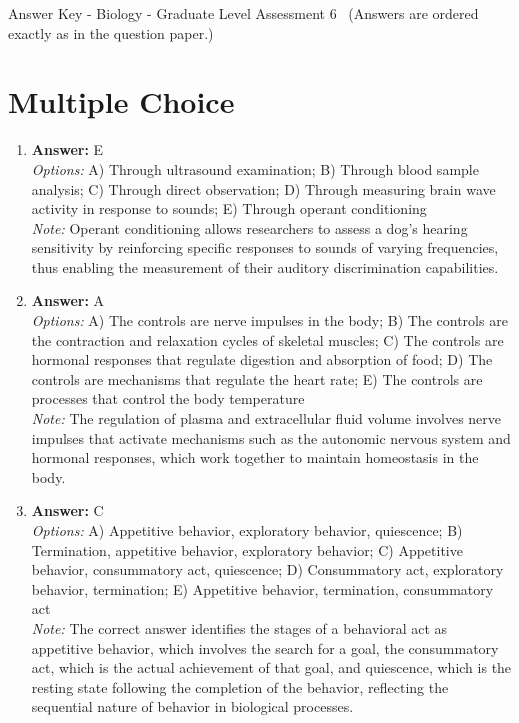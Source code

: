 \documentclass[12pt]{article}
\begin{document}
\begin{center}
Answer Key - Biology - Graduate Level Assessment 6 \
\small (Answers are ordered exactly as in the question paper.)
\end{center}

\section*{Multiple Choice}
\begin{enumerate}[label=\arabic*.]
\item \textbf{Answer:} E
\\ \textit{Options:} A) Through ultrasound examination; B) Through blood sample analysis; C) Through direct observation; D) Through measuring brain wave activity in response to sounds; E) Through operant conditioning
\\ \textit{Note:} Operant conditioning allows researchers to assess a dog's hearing sensitivity by reinforcing specific responses to sounds of varying frequencies, thus enabling the measurement of their auditory discrimination capabilities.
\item \textbf{Answer:} A
\\ \textit{Options:} A) The controls are nerve impulses in the body; B) The controls are the contraction and relaxation cycles of skeletal muscles; C) The controls are hormonal responses that regulate digestion and absorption of food; D) The controls are mechanisms that regulate the heart rate; E) The controls are processes that control the body temperature
\\ \textit{Note:} The regulation of plasma and extracellular fluid volume involves nerve impulses that activate mechanisms such as the autonomic nervous system and hormonal responses, which work together to maintain homeostasis in the body.
\item \textbf{Answer:} C
\\ \textit{Options:} A) Appetitive behavior, exploratory behavior, quiescence; B) Termination, appetitive behavior, exploratory behavior; C) Appetitive behavior, consummatory act, quiescence; D) Consummatory act, exploratory behavior, termination; E) Appetitive behavior, termination, consummatory act
\\ \textit{Note:} The correct answer identifies the stages of a behavioral act as appetitive behavior, which involves the search for a goal, the consummatory act, which is the actual achievement of that goal, and quiescence, which is the resting state following the completion of the behavior, reflecting the sequential nature of behavior in biological processes.

\end{enumerate}
\end{document}
